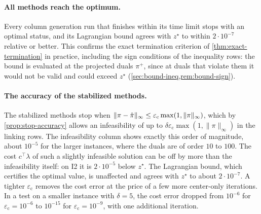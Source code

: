 \begin{table}[!htbp]
\centering
\scriptsize
\renewcommand{\arraystretch}{1.15}
\setlength{\tabcolsep}{4pt}
\caption{Inequality variant (30\% ``$\ge$'' rows). The eliminated HiGHS QP master is not
run on this variant, and the explicit HiGHS QP master is run on I1 only.}
\label{tab:comparison-ineq}
\end{table}

\paragraph{All methods reach the optimum.} Every column generation run that finishes within
its time limit stops with an optimal status, and its Lagrangian bound agrees with $z^\star$
to within $2\cdot10^{-7}$ relative or better. This confirms the exact termination criterion
of \cref{thm:exact-termination} in practice, including the sign conditions of the inequality
rows: the bound is evaluated at the projected duals $\pi^+$, since at duals that violate them it
would not be valid and could exceed $z^\star$ (\cref{sec:bound-ineq,rem:bound-sign}).

\paragraph{The accuracy of the stabilized methods.} The stabilized methods stop when
$\lVert\pi-\hat{\pi}\rVert_\infty\le\varepsilon_{\mathrm{c}}\max(1,\lVert\pi\rVert_\infty)$, which by
\cref{prop:stop-accuracy} allows an infeasibility of up to $\delta\varepsilon_{\mathrm{c}}\max(1,\lVert\pi\rVert_\infty)$
in the linking rows. The infeasibility column shows exactly this order of magnitude, about
$10^{-5}$ for the larger instances, where the duals are of order $10$ to $100$. The cost
$c^\top\lambda$ of such a slightly infeasible solution can be off by more than the
infeasibility itself: on I2 it is $2\cdot10^{-5}$ below $z^\star$. The Lagrangian bound, which
certifies the optimal value, is unaffected and agrees with $z^\star$ to about $2\cdot10^{-7}$. A
tighter $\varepsilon_{\mathrm{c}}$ removes the cost error at the price of a few more center-only iterations. In a
test on a smaller instance with $\delta = 5$, the cost error dropped from $10^{-6}$ for
$\varepsilon_{\mathrm{c}} = 10^{-6}$ to $10^{-15}$ for $\varepsilon_{\mathrm{c}} = 10^{-9}$, with one additional iteration.

